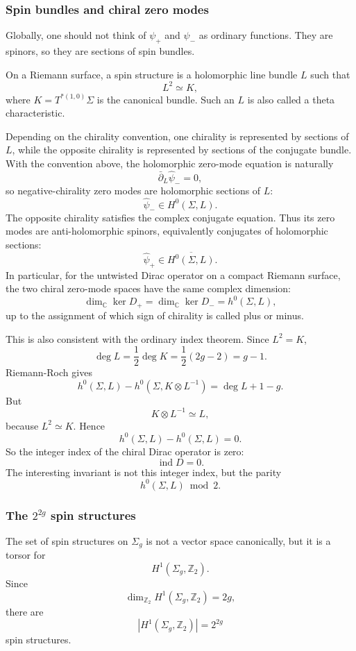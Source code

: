 \documentclass[
  10pt,
  a4paper,
  openany]{book}
\begin{document}
\subsubsection{Spin bundles and chiral zero
modes}\label{spin-bundles-and-chiral-zero-modes}

Globally, one should not think of \(\psi_+\) and \(\psi_-\) as ordinary
functions. They are spinors, so they are sections of spin bundles.

On a Riemann surface, a spin structure is a holomorphic line bundle
\(L\) such that \[
L^2\simeq K,
\] where \(K=T^{*(1,0)}\Sigma\) is the canonical bundle. Such an \(L\)
is also called a theta characteristic.

Depending on the chirality convention, one chirality is represented by
sections of \(L\), while the opposite chirality is represented by
sections of the conjugate bundle. With the convention above, the
holomorphic zero-mode equation is naturally \[
\bar\partial_L \widehat\psi_-=0,
\] so negative-chirality zero modes are holomorphic sections of \(L\):
\[
\widehat\psi_-\in H^0(\Sigma,L).
\] The opposite chirality satisfies the complex conjugate equation. Thus
its zero modes are anti-holomorphic spinors, equivalently conjugates of
holomorphic sections: \[
\widehat\psi_+\in \overline{H^0(\Sigma,L)}.
\] In particular, for the untwisted Dirac operator on a compact Riemann
surface, the two chiral zero-mode spaces have the same complex
dimension: \[
\dim_{\mathbb C}\ker D_+
=
\dim_{\mathbb C}\ker D_-
=
h^0(\Sigma,L),
\] up to the assignment of which sign of chirality is called plus or
minus.

This is also consistent with the ordinary index theorem. Since
\(L^2=K\), \[
\deg L
=
\frac{1}{2}\deg K
=
\frac{1}{2}(2g-2)
=
g-1.
\] Riemann-Roch gives \[
h^0(\Sigma,L)-h^0(\Sigma,K\otimes L^{-1})
=
\deg L+1-g.
\] But \[
K\otimes L^{-1}\simeq L,
\] because \(L^2\simeq K\). Hence \[
h^0(\Sigma,L)-h^0(\Sigma,L)=0.
\] So the integer index of the chiral Dirac operator is zero: \[
\operatorname{ind}D=0.
\] The interesting invariant is not this integer index, but the parity
\[
h^0(\Sigma,L)\bmod 2.
\]

\subsubsection{\texorpdfstring{The \(2^{2g}\) spin
structures}{The 2\^{}\{2g\} spin structures}}\label{the-22g-spin-structures}

The set of spin structures on \(\Sigma_g\) is not a vector space
canonically, but it is a torsor for \[
H^1(\Sigma_g,\mathbb Z_2).
\] Since \[
\dim_{\mathbb Z_2}H^1(\Sigma_g,\mathbb Z_2)=2g,
\] there are \[
\left|H^1(\Sigma_g,\mathbb Z_2)\right|
=
2^{2g}
\] spin structures.
\end{document}
